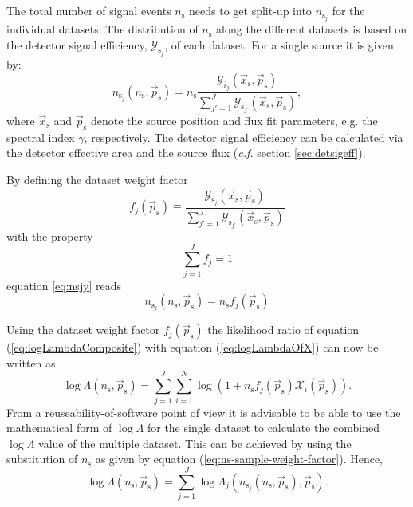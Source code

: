 \documentclass{article}
\newcommand{\eq}[1]{(\ref{#1})}
\newcommand{\ns}{n_{\mathrm{s}}}
\newcommand{\ps}{\vec{p}_{\mathrm{s}}}
\newcommand{\xs}{\vec{x}_{\mathrm{s}}}
\begin{document}
The total number of signal events $\ns$ needs to get split-up into
$n_{\mathrm{s}_j}$ for the individual datasets. The distribution of $\ns$
along the different datasets is based on the detector signal efficiency,
$\mathcal{Y}_{\mathrm{s}_j}$, of each dataset. For a single source it is given by:
\begin{equation}
 n_{\mathrm{s}_j}(\ns,\ps) = \ns \frac{\mathcal{Y}_{\mathrm{s}_j}(\xs,\ps)}{\sum_{j'=1}^{J} \mathcal{Y}_{\mathrm{s}_{j'}}(\xs,\ps)},
 \label{eq:nsjy}
\end{equation}
where $\xs$ and $\ps$ denote the source position and flux fit parameters, e.g.
the spectral index $\gamma$, respectively. The detector signal efficiency can be
calculated via the detector effective area and the source flux (\emph{c.f.} section
\ref{sec:detsigeff}).

By defining the dataset weight factor
\begin{equation}
 f_j(\ps) \equiv \frac{\mathcal{Y}_{\mathrm{s}_j}(\xs,\ps)}{\sum_{j'=1}^{J} \mathcal{Y}_{\mathrm{s}_{j'}}(\xs,\ps)}
 \label{eq:dataset-weight-factor-single-source}
\end{equation}
with the property
\begin{equation}
 \sum_{j=1}^{J} f_j = 1
\end{equation}
equation \ref{eq:nsjy} reads
\begin{equation}
 n_{\mathrm{s}_j}(\ns,\ps) = \ns f_{j}(\ps)
 \label{eq:ns-sample-weight-factor}
\end{equation}

Using the dataset weight factor $f_{j}(\ps)$ the likelihood ratio of
equation \eq{eq:logLambdaComposite} with equation \eq{eq:logLambdaOfX} can now
be written as
\begin{equation}
 \log \Lambda(\ns,\ps) = \sum_{j=1}^{J} \sum_{i=1}^{N} \log (1 + \ns f_{j}(\ps)\mathcal{X}_i(\ps)).
\end{equation}
From a reuseability-of-software point of view it is advisable to be able to use
the mathematical form of $\log \Lambda$ for the single dataset to calculate the
combined $\log \Lambda$ value of the multiple dataset. This can be achieved by
using the substitution of $\ns$ as given by equation (\ref{eq:ns-sample-weight-factor}).
Hence,
\begin{equation}
 \log \Lambda(\ns,\ps) = \sum_{j=1}^{J} \log \Lambda_j(n_{\mathrm{s}_j}(\ns,\ps),\ps).
 \label{eq:logLambdaOfLogLambdaj}
\end{equation}
\end{document}
